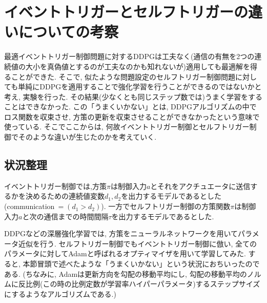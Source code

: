 \documentclass{jsarticle}
\begin{document}
\section{イベントトリガーとセルフトリガーの違いについての考察}
最適イベントトリガー制御問題に対するDDPGは工夫なく(通信の有無を2つの連続値の大小を真偽値とするのが工夫なのかも知れないが)適用しても最適解を得ることができた. そこで, 似たような問題設定のセルフトリガー制御問題に対しても単純にDDPGを適用することで強化学習を行うことができるのではないかと考え, 実験を行った. その結果(少なくとも同じステップ数では)うまく学習をすることはできなかった. この「うまくいかない」とは, DDPGアルゴリズムの中でロス関数を収束させ, 方策の更新を収束させることができなかったという意味で使っている. そこでここからは, 何故イベントトリガー制御とセルフトリガー制御でそのような違いが生じたのかを考えていく.\par

\subsection{状況整理}
イベントトリガー制御では,方策$\pi$は制御入力$a$とそれをアクチュエータに送信するかを決めるための連続値変数$d_1, d_2$を出力するモデルであるとした(communication$~=(d_1> d_2)$). 一方でセルフトリガー制御の方策関数$\pi$は制御入力$a$と次の通信までの時間間隔$\tau$を出力するモデルであるとした. \par
DDPGなどの深層強化学習では, 方策をニューラルネットワークを用いてパラメータ近似を行う. セルフトリガー制御でもイベントトリガー制御に倣い, 全てのパラメータに対してAdamと呼ばれるオプティマイザを用いて学習してみた. すると, 本節冒頭で述べたような「うまくいかない」という状況におちいったのである. (ちなみに, Adamは更新方向を勾配の移動平均にし, 勾配の移動平均のノルムに反比例(この時の比例定数が学習率ハイパーパラメータ)するステップサイズにするようなアルゴリズムである.)
\end{document}
